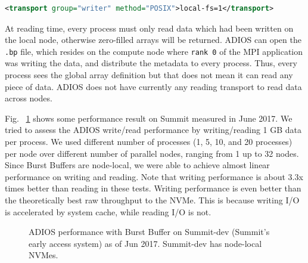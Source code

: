 \begin{lstlisting}[language=XML]
<transport group="writer" method="POSIX">local-fs=1</transport>
\end{lstlisting}

At reading time, every process must only read data which had been written on the local node, otherwise zero-filled arrays will be returned. ADIOS can open the \verb+.bp+ file, which resides on the compute node where \verb+rank 0+ of the MPI application was writing the data, and distribute the metadata to every process. Thus, every process sees the global array definition but that does not mean it can read any piece of data. ADIOS does not have currently any reading transport to read data across nodes. 

Fig. ~\ref{fig:summit} shows some performance result on Summit measured in June 2017. We tried to assess the ADIOS write/read performance by writing/reading 1 GB data per process. We used different number of processes (1, 5, 10, and 20 processes) per node over different number of parallel nodes, ranging from 1 up to 32 nodes. Since Burst Buffers are node-local, we were able to achieve almost linear performance on writing and reading.  Note that writing performance is about 3.3x times better than reading in these tests. Writing performance is even better than the theoretically best raw throughput to the NVMe. This is because writing I/O is accelerated by system cache, while reading I/O is not. 

\begin{figure}[h]
\center
{}
\caption{ADIOS performance with Burst Buffer on Summit-dev (Summit's early access system) as of Jun 2017. Summit-dev has node-local NVMes.}
\label{fig:summit}
\end{figure}

